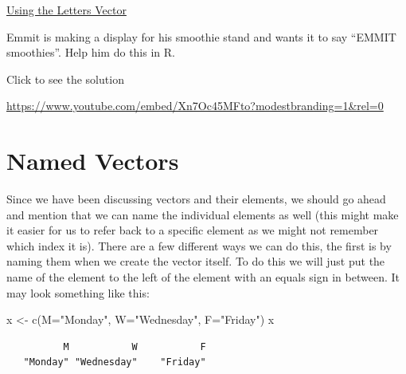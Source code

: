 \documentclass[
  letterpaper,
  DIV=11,
  numbers=noendperiod]{scrreprt}
\newenvironment{Shaded}{\begin{snugshade}}{\end{snugshade}}
\newcommand{\AttributeTok}[1]{\textcolor[rgb]{0.40,0.45,0.13}{#1}}
\newcommand{\FunctionTok}[1]{\textcolor[rgb]{0.28,0.35,0.67}{#1}}
\newcommand{\NormalTok}[1]{\textcolor[rgb]{0.00,0.23,0.31}{#1}}
\newcommand{\OtherTok}[1]{\textcolor[rgb]{0.00,0.23,0.31}{#1}}
\newcommand{\StringTok}[1]{\textcolor[rgb]{0.13,0.47,0.30}{#1}}
\begin{document}
\begin{watch}{}{}
    \href{https://youtu.be/H-q_LZVM0_0}{Using the Letters Vector}
\end{watch}

\begin{tcolorbox}[enhanced jigsaw, colbacktitle=quarto-callout-tip-color!10!white, breakable, bottomrule=.15mm, colframe=quarto-callout-tip-color-frame, left=2mm, opacitybacktitle=0.6, title=\textcolor{quarto-callout-tip-color}{\faLightbulb}\hspace{0.5em}{Try it Out}, leftrule=.75mm, opacityback=0, rightrule=.15mm, titlerule=0mm, bottomtitle=1mm, colback=white, toprule=.15mm, arc=.35mm, toptitle=1mm, coltitle=black]

Emmit is making a display for his smoothie stand and wants it to say
``EMMIT smoothies''. Help him do this in R.

Click to see the solution

\url{https://www.youtube.com/embed/Xn7Oc45MFto?modestbranding=1&rel=0}

\end{tcolorbox}

\section{Named Vectors}\label{named-vectors}

Since we have been discussing vectors and their elements, we should go
ahead and mention that we can name the individual elements as well (this
might make it easier for us to refer back to a specific element as we
might not remember which index it is). There are a few different ways we
can do this, the first is by naming them when we create the vector
itself. To do this we will just put the name of the element to the left
of the element with an equals sign in between. It may look something
like this:

\begin{Shaded}
\begin{Highlighting}[]
\NormalTok{x }\OtherTok{\textless{}{-}} \FunctionTok{c}\NormalTok{(}\AttributeTok{M=}\StringTok{"Monday"}\NormalTok{, }\AttributeTok{W=}\StringTok{"Wednesday"}\NormalTok{, }\AttributeTok{F=}\StringTok{"Friday"}\NormalTok{)}
\NormalTok{x}
\end{Highlighting}
\end{Shaded}

\begin{verbatim}
          M           W           F 
   "Monday" "Wednesday"    "Friday" 
\end{verbatim}
\end{document}
